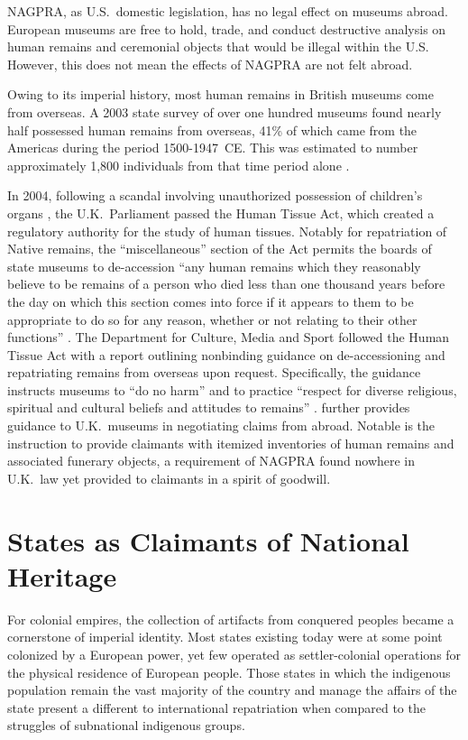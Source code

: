 \documentclass[american]{../../../coursework}
\begin{document}
NAGPRA, as U.S.\ domestic legislation, has no legal effect on museums abroad.
European museums are free to hold, trade, and conduct destructive analysis on
human remains and ceremonial objects that would be illegal within the U.S\@.
However, this does not mean the effects of NAGPRA are not felt abroad.

Owing to its imperial history, most human remains in British museums come from
overseas. A 2003 state survey of over one hundred museums found nearly half
possessed human remains from overseas, 41\% of which came from the Americas
during the period 1500-1947~CE\@. This was estimated to number approximately
1,800 individuals from that time period alone \parencite{Wee03}.

In 2004, following a scandal involving unauthorized possession of children's
organs \parencite[see][]{Bur02}, the U.K.\ Parliament passed the Human Tissue
Act, which created a regulatory authority for the study of human tissues.
Notably for repatriation of Native remains, the ``miscellaneous'' section of
the Act permits the boards of state museums to de-accession ``any human
remains which they reasonably believe to be remains of a person who died less
than one thousand years before the day on which this section comes into force
if it appears to them to be appropriate to do so for any reason, whether or
not relating to their other functions'' \parencite{Hum04}. The Department for
Culture, Media and Sport followed the Human Tissue Act with a report outlining
nonbinding guidance on de-accessioning and repatriating remains from overseas
upon request. Specifically, the guidance instructs museums to ``do no harm''
and to practice ``respect for diverse religious, spiritual and cultural
beliefs and attitudes to remains'' \parencite[14]{Dep05}. \textcite{Gie09}
further provides guidance to U.K.\ museums in negotiating claims from abroad.
Notable is the instruction to provide claimants with itemized inventories of
human remains and associated funerary objects, a requirement of NAGPRA found
nowhere in U.K.\ law yet provided to claimants in a spirit of goodwill. 

\section{States as Claimants of National Heritage}

For colonial empires, the collection of artifacts from conquered peoples
became a cornerstone of imperial identity. Most states existing today were at
some point colonized by a European power, yet few operated as settler-colonial
operations for the physical residence of European people. Those states in
which the indigenous population remain the vast majority of the country and
manage the affairs of the state present a different to international
repatriation when compared to the struggles of subnational indigenous groups.
\end{document}

